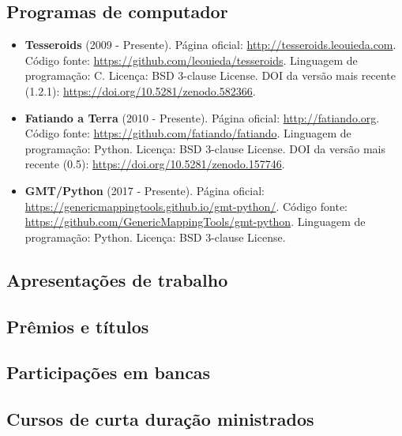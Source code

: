\subsection{Programas de computador}

\begin{itemize}
    \item \textbf{Tesseroids} (2009 - Presente).
        Página oficial: \url{http://tesseroids.leouieda.com}.
        Código fonte: \url{https://github.com/leouieda/tesseroids}.
        Linguagem de programação: C.
        Licença: BSD 3-clause License.
        DOI da versão mais recente (1.2.1):
        \url{https://doi.org/10.5281/zenodo.582366}.
    \item \textbf{Fatiando a Terra} (2010 - Presente).
        Página oficial: \url{http://fatiando.org}.
        Código fonte: \url{https://github.com/fatiando/fatiando}.
        Linguagem de programação: Python.
        Licença: BSD 3-clause License.
        DOI da versão mais recente (0.5):
        \url{https://doi.org/10.5281/zenodo.157746}.
    \item \textbf{GMT/Python} (2017 - Presente).
        Página oficial: \url{https://genericmappingtools.github.io/gmt-python/}.
        Código fonte: \url{https://github.com/GenericMappingTools/gmt-python}.
        Linguagem de programação: Python.
        Licença: BSD 3-clause License.
\end{itemize}

\subsection{Apresentações de trabalho}


\subsection{Prêmios e títulos}


\subsection{Participações em bancas}


\subsection{Cursos de curta duração ministrados}
